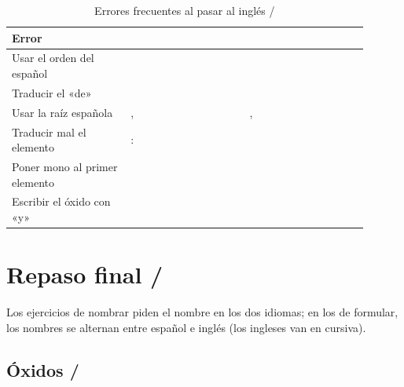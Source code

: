 \begin{table}[H]
    \centering
    \caption{Errores frecuentes al pasar al inglés / }
    \vspace{-5pt}
    \begin{tabular}{@{}L{0.3\linewidth} L{0.3\linewidth} L{0.3\linewidth}@{}}
        \toprule
        \textbf{Error} & \textbf{} & \textbf{} \\
        \midrule
        Usar el orden del español &  &  \\[3pt]
        Traducir el «de» &  &  \\[3pt]
        Usar la raíz española & ,  & ,  \\[3pt]
        Traducir mal el elemento & :  &  \\[3pt]
        Poner mono al primer elemento &  &  \\[3pt]
        Escribir el óxido con «y» &  &  \\
        \bottomrule
    \end{tabular}
    \label{tab:u4_errores_en}
\end{table}

\newpage
\section{Repaso final / }

Los ejercicios de nombrar piden el nombre en los dos idiomas; en los de formular, los nombres se alternan entre español e inglés (los ingleses van en cursiva).

\subsection{Óxidos / }

